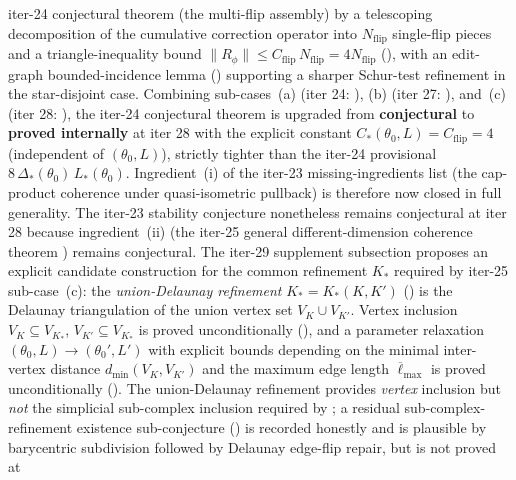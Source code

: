 \documentclass[11pt]{article}
\numberwithin{equation}{section}
\theoremstyle{definition}
\theoremstyle{remark}
\begin{document}
\begin{itemize}[leftmargin=2em]
iter-24 conjectural theorem (the multi-flip assembly) by a
telescoping decomposition of the cumulative correction operator
into \(N_{\mathrm{flip}}\) single-flip pieces and a
triangle-inequality bound
\(\|R_\phi\|\le C_{\mathrm{flip}}\,N_{\mathrm{flip}}=4N_{\mathrm{flip}}\)
(), with an edit-graph
bounded-incidence lemma
() supporting a sharper
Schur-test refinement in the star-disjoint case. Combining
sub-cases~(a) (iter 24: ),
(b) (iter 27:
), and~(c) (iter 28:
), the iter-24 conjectural
theorem  is upgraded
from \textbf{conjectural} to \textbf{proved internally} at iter 28
with the explicit constant
\(C_*(\theta_0,L)=C_{\mathrm{flip}}=4\) (independent of
\((\theta_0,L)\)), strictly tighter than the iter-24 provisional
\(8\,\Delta_*(\theta_0)\,L_*(\theta_0)\). Ingredient~(i) of the
iter-23 missing-ingredients list (the cap-product coherence
under quasi-isometric pullback) is therefore now closed in full
generality. The iter-23 stability conjecture
 nonetheless
remains conjectural at iter 28 because ingredient~(ii) (the
iter-25 general different-dimension coherence theorem
) remains conjectural.
The iter-29 supplement subsection
 proposes an explicit
candidate construction for the common refinement \(K_*\)
required by iter-25 sub-case~(c): the \emph{union-Delaunay
refinement} \(K_*=K_*(K,K')\)
() is the Delaunay
triangulation of the union vertex set \(V_K\cup V_{K'}\).
Vertex inclusion \(V_K\subseteq V_{K_*}\),
\(V_{K'}\subseteq V_{K_*}\) is proved unconditionally
(), and a parameter
relaxation
\((\theta_0,L)\to(\theta_0',L')\) with explicit bounds
depending on the minimal inter-vertex distance
\(d_{\min}(V_K,V_{K'})\) and the maximum edge length
\(\overline{\ell}_{\max}\) is proved unconditionally
(). The
union-Delaunay refinement provides \emph{vertex} inclusion but
\emph{not} the simplicial sub-complex inclusion required by
; a residual
sub-complex-refinement existence sub-conjecture
() is
recorded honestly and is plausible by barycentric subdivision
followed by Delaunay edge-flip repair, but is not proved at

\end{itemize}
\end{document}
